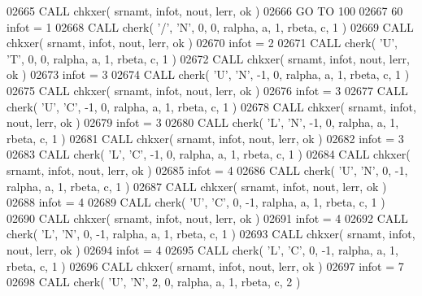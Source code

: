 \begin{DoxyCode}
02665       \textcolor{keyword}{CALL }chkxer( srnamt, infot, nout, lerr, ok )
02666       \textcolor{keywordflow}{GO TO} 100
02667    60 infot = 1
02668       \textcolor{keyword}{CALL }cherk( \textcolor{stringliteral}{'/'}, \textcolor{stringliteral}{'N'}, 0, 0, ralpha, a, 1, rbeta, c, 1 )
02669       \textcolor{keyword}{CALL }chkxer( srnamt, infot, nout, lerr, ok )
02670       infot = 2
02671       \textcolor{keyword}{CALL }cherk( \textcolor{stringliteral}{'U'}, \textcolor{stringliteral}{'T'}, 0, 0, ralpha, a, 1, rbeta, c, 1 )
02672       \textcolor{keyword}{CALL }chkxer( srnamt, infot, nout, lerr, ok )
02673       infot = 3
02674       \textcolor{keyword}{CALL }cherk( \textcolor{stringliteral}{'U'}, \textcolor{stringliteral}{'N'}, -1, 0, ralpha, a, 1, rbeta, c, 1 )
02675       \textcolor{keyword}{CALL }chkxer( srnamt, infot, nout, lerr, ok )
02676       infot = 3
02677       \textcolor{keyword}{CALL }cherk( \textcolor{stringliteral}{'U'}, \textcolor{stringliteral}{'C'}, -1, 0, ralpha, a, 1, rbeta, c, 1 )
02678       \textcolor{keyword}{CALL }chkxer( srnamt, infot, nout, lerr, ok )
02679       infot = 3
02680       \textcolor{keyword}{CALL }cherk( \textcolor{stringliteral}{'L'}, \textcolor{stringliteral}{'N'}, -1, 0, ralpha, a, 1, rbeta, c, 1 )
02681       \textcolor{keyword}{CALL }chkxer( srnamt, infot, nout, lerr, ok )
02682       infot = 3
02683       \textcolor{keyword}{CALL }cherk( \textcolor{stringliteral}{'L'}, \textcolor{stringliteral}{'C'}, -1, 0, ralpha, a, 1, rbeta, c, 1 )
02684       \textcolor{keyword}{CALL }chkxer( srnamt, infot, nout, lerr, ok )
02685       infot = 4
02686       \textcolor{keyword}{CALL }cherk( \textcolor{stringliteral}{'U'}, \textcolor{stringliteral}{'N'}, 0, -1, ralpha, a, 1, rbeta, c, 1 )
02687       \textcolor{keyword}{CALL }chkxer( srnamt, infot, nout, lerr, ok )
02688       infot = 4
02689       \textcolor{keyword}{CALL }cherk( \textcolor{stringliteral}{'U'}, \textcolor{stringliteral}{'C'}, 0, -1, ralpha, a, 1, rbeta, c, 1 )
02690       \textcolor{keyword}{CALL }chkxer( srnamt, infot, nout, lerr, ok )
02691       infot = 4
02692       \textcolor{keyword}{CALL }cherk( \textcolor{stringliteral}{'L'}, \textcolor{stringliteral}{'N'}, 0, -1, ralpha, a, 1, rbeta, c, 1 )
02693       \textcolor{keyword}{CALL }chkxer( srnamt, infot, nout, lerr, ok )
02694       infot = 4
02695       \textcolor{keyword}{CALL }cherk( \textcolor{stringliteral}{'L'}, \textcolor{stringliteral}{'C'}, 0, -1, ralpha, a, 1, rbeta, c, 1 )
02696       \textcolor{keyword}{CALL }chkxer( srnamt, infot, nout, lerr, ok )
02697       infot = 7
02698       \textcolor{keyword}{CALL }cherk( \textcolor{stringliteral}{'U'}, \textcolor{stringliteral}{'N'}, 2, 0, ralpha, a, 1, rbeta, c, 2 )

\end{DoxyCode}
